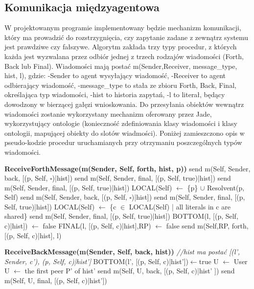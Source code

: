 \documentclass[a4paper,12pt]{mwart}
\begin{document}
\subsection{Komunikacja międzyagentowa}
W projektowanym programie implementowany będzie mechanizm komunikacji, który ma prowadzić do rozstrzygnięcia, czy zapytanie zadane z zewnątrz systemu jest prawdziwe czy fałszywe.
Algorytm zakłada trzy typy procedur, z których każda jest wyzwalana przez odbiór jednej z trzech rodzajów wiadomości (Forth, Back lub Final). Wiadomości mają postać m(Sender,Receiver, message\_type, hist, l), gdzie:
-Sender to agent wysyłający wiadomość,
-Receiver to agent odbierający wiadomość,
-message\_type to stała ze zbioru {Forth, Back, Final}, określająca typ wiadomości,
-hist to historia zapytań,
-l to literał, będący dowodzony w bierzącej gałęzi wnioskowania.
Do przesyłania obiektów wewnątrz wiadomości zostanie wykorzystany mechanizm oferowany przez Jade, wykorzystujący ontologie (konieczność zdefiniowania klasy wiadomości i klasy ontologii, mapującej obiekty do slotów wiadmości). Poniżej zamieszczono opis w pseudo-kodzie procedur uruchamianych przy otrzymaniu poszczególnych typów wiadomości.
\begin{algorithm}
\begin{algorithmic}
\STATE \textbf{ReceiveForthMessage(m(Sender, Self, forth, hist, p))}
\STATE send m(Self, Sender, back, [(p, Self, $\square$)|hist])
\STATE send m(Self, Sender, final, [(p, Self, true)|hist])
\STATE send m(Self, Sender, final, [(p, Self, true)|hist])
\ELSE
\STATE LOCAL(Self) $\leftarrow$ \{p\} $\cup$ Resolvent(p, Self)
\STATE send m(Self, Sender, back, [(p, Self, $\square$)|hist])
\STATE send m(Self, Sender, final, [(p, Self, true)|hist])
\ELSE
\STATE LOCAL(Self) $\leftarrow$ \{c $\in$ LOCAL(Self) | all literals in c are shared\}
\STATE send m(Self, Sender, final, [(p, Self, true)|hist])
\ENDIF
{}
\STATE BOTTOM(l, [(p, Self, c)|hist]) $\leftarrow$ false
\STATE FINAL(l, [(p, Self, c)|hist],RP) $\leftarrow$ false
\STATE send m(Self,RP, forth, [(p, Self, c)|hist], l)
\ENDFOR
\ENDFOR
\ENDFOR
\ENDIF
\ENDIF
\end{algorithmic}
\end{algorithm}
\begin{algorithm}
\begin{algorithmic}
\STATE \textbf{ReceiveBackMessage(m(Sender, Self, back, hist))}
\STATE \textit{//hist ma postać [(l', Sender, c'), (p, Self, c)|hist']}
\STATE BOTTOM(l', [(p, Self, c)|hist'])$\leftarrow$true
\STATE U $\leftarrow$ User
\ELSE
\STATE U $\leftarrow$ the first peer P' of hist'
\ENDIF
\STATE send m(Self, U, back, [(p, Self, c)|hist' ])
\STATE send m(Self, U, final, [(p, Self, c)|hist'])
\ENDIF
\end{algorithmic}
\end{algorithm}
\end{document}
